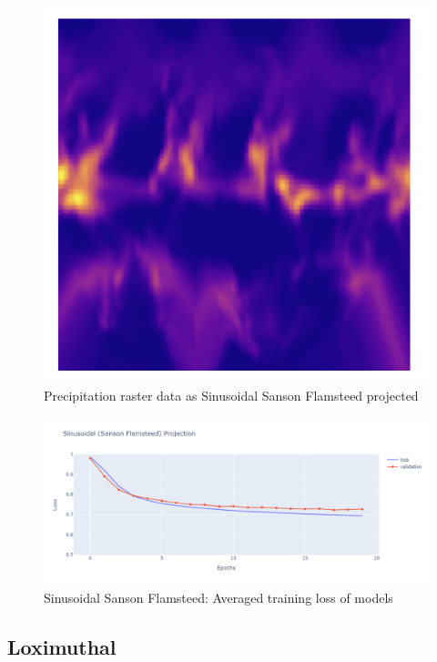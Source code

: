 \begin{figure}[H]
\begin{minipage}{0.30\textwidth}
        \label{fig:ig_proj}
    \end{minipage}\hfill
    \begin{minipage}{0.30\textwidth}
        \centering
        \includegraphics[width=0.9\linewidth]{figures/chapter-8/prect_goode.png}
        \caption{Precipitation raster data as Sinusoidal Sanson Flamsteed projected}
        \label{fig:ig_prect_raster}
    \end{minipage}\hfill
\end{figure}


\begin{figure}[H]
    \centering
    \includegraphics[width=1.0\linewidth]{figures/chapter-8/sinu_loss.png}
    \caption{Sinusoidal Sanson Flamsteed: Averaged training loss of models  }
    \label{fig:sinu_loss}
\end{figure}

\subsection{Loximuthal}

